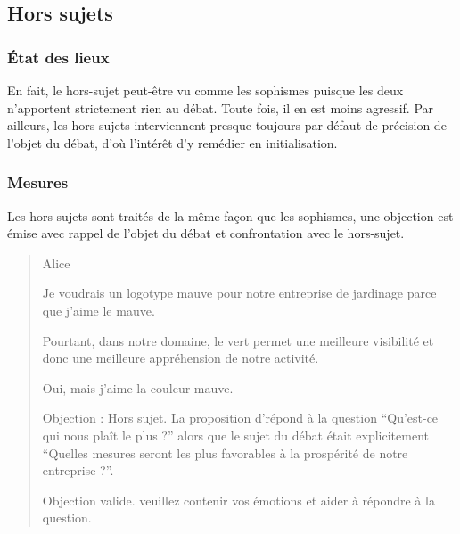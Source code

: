 \subsection{Hors sujets}
\subsubsection{État des lieux}
En fait, le hors-sujet peut-être vu comme les sophismes puisque les deux n’apportent strictement rien au débat. Toute fois, il en est moins agressif. Par ailleurs, les hors sujets interviennent presque toujours par défaut de précision de l’objet du débat, d’où l’intérêt d’y remédier en initialisation.

\subsubsection{Mesures}
Les hors sujets sont traités de la même façon que les sophismes, une objection est émise avec rappel de l’objet du débat et confrontation avec le hors-sujet.

\begin{quote}
  \begin{drama}{0cm}{0cm}{Alice}

    \Aspeaks       Je voudrais un logotype mauve pour notre entreprise de jardinage parce que j’aime le mauve.

    \Bspeaks       Pourtant, dans notre domaine, le vert permet une meilleure visibilité et donc une meilleure appréhension de notre activité.

    \Aspeaks       Oui, mais j’aime la couleur mauve.

    \Bspeaks       Objection : Hors sujet. La proposition d’\A répond à la question \enquote{Qu’est-ce qui nous plaît le plus ?} alors que le sujet du débat était explicitement \enquote{Quelles mesures seront les plus favorables à la prospérité de notre entreprise ?}.

    \Arbitrespeaks Objection valide. \A veuillez contenir vos émotions et aider à répondre à la question.

  \end{drama}
\end{quote}

